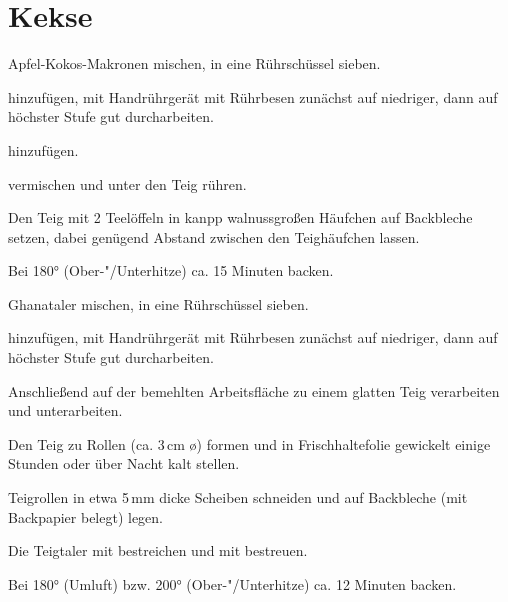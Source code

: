 \section{Kekse}

\begin{recipe}{Apfel-Kokos-Makronen}
  mischen, in eine Rührschüssel sieben.

  hinzufügen, mit Handrührgerät mit Rührbesen zunächst auf niedriger,
  dann auf höchster Stufe gut durcharbeiten.

  hinzufügen.
  
  vermischen und unter den Teig rühren.

  Den Teig mit 2 Teelöffeln in kanpp walnussgroßen Häufchen auf
  Backbleche setzen, dabei genügend Abstand zwischen den Teighäufchen
  lassen.
  
  Bei 180° (Ober-"/Unterhitze) ca. 15 Minuten backen.

\end{recipe}



\begin{recipe}{Ghanataler}
  mischen, in eine Rührschüssel sieben.

  hinzufügen, mit Handrührgerät mit Rührbesen zunächst auf niedriger,
  dann auf höchster Stufe gut durcharbeiten.

  Anschließend auf der bemehlten Arbeitsfläche zu einem glatten Teig
  verarbeiten und
  unterarbeiten.

  Den Teig zu Rollen (ca. 3\,cm \o) formen und in Frischhaltefolie gewickelt
  einige Stunden oder über Nacht kalt stellen.

  Teigrollen in etwa 5\,mm dicke Scheiben schneiden und auf Backbleche
  (mit Backpapier belegt) legen.

  Die Teigtaler mit
  bestreichen und mit
  bestreuen.

  Bei 180° (Umluft) bzw. 200° (Ober-"/Unterhitze) ca. 12 Minuten backen.
\end{recipe}



